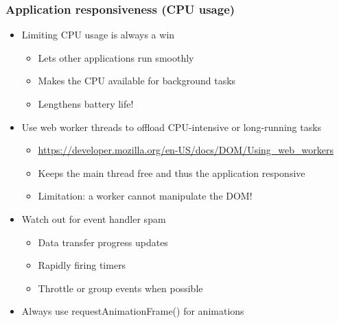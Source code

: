 \begin{frame}
 \frametitle{Application responsiveness (CPU usage)}
 \begin{itemize}
 \item Limiting CPU usage is always a win
 \begin{itemize}
  \item Lets other applications run smoothly
  \item Makes the CPU available for background tasks
  \item Lengthens battery life!
 \end{itemize}
  \item Use web worker threads to offload CPU-intensive or long-running tasks
  \begin{itemize}
   \item \url{https://developer.mozilla.org/en-US/docs/DOM/Using_web_workers}
   \item Keeps the main thread free and thus the application responsive
   \item Limitation: a worker cannot manipulate the DOM!
  \end{itemize}
  \item Watch out for event handler spam
   \begin{itemize}
    \item Data transfer progress updates
    \item Rapidly firing timers
    \item Throttle or group events when possible
   \end{itemize}
  \item Always use requestAnimationFrame() for animations
 \end{itemize}
\end{frame}
